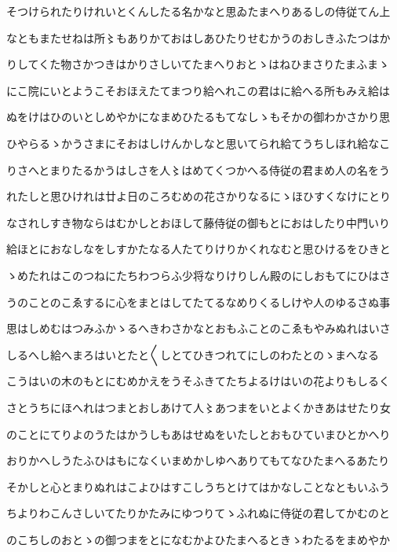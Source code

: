 \documentclass[a4paper,11pt,landscape]{ltjtarticle}
\begin{document}
そつけられたりけれいとくんしたる名かなと思ゐたまへりあるしの侍従てん上
\par\medskip
なともまたせねは所〻もありかておはしあひたりせむかうのおしきふたつはか
\par\medskip
りしてくた物さかつきはかりさしいてたまへりおとゝはねひまさりたまふまゝ
\par\medskip
にこ院にいとようこそおほえたてまつり給へれこの君はに給へる所もみえ給は
\par\medskip
ぬをけはひのいとしめやかになまめひたるもてなしゝもそかの御わかさかり思
\par\medskip
ひやらるゝかうさまにそおはしけんかしなと思いてられ給てうちしほれ給なこ
\par\medskip
りさへとまりたるかうはしさを人〻はめてくつかへる侍従の君まめ人の名をう
\par\medskip
れたしと思ひけれは廿よ日のころむめの花さかりなるにゝほひすくなけにとり
\par\medskip
なされしすき物ならはむかしとおほして藤侍従の御もとにおはしたり中門いり
\par\medskip
給ほとにおなしなをしすかたなる人たてりけりかくれなむと思ひけるをひきと
\par\medskip
ゝめたれはこのつねにたちわつらふ少将なりけりしん殿のにしおもてにひはさ
\par\medskip
うのことのこゑするに心をまとはしてたてるなめりくるしけや人のゆるさぬ事
\par\medskip
思はしめむはつみふかゝるへきわさかなとおもふことのこゑもやみぬれはいさ
\par\medskip
しるへし給へまろはいとたと〱しとてひきつれてにしのわたとのゝまへなる
\par\medskip
こうはいの木のもとにむめかえをうそふきてたちよるけはいの花よりもしるく
\par\medskip
さとうちにほへれはつまとおしあけて人〻あつまをいとよくかきあはせたり女
\par\medskip
のことにてりよのうたはかうしもあはせぬをいたしとおもひていまひとかへり
\par\medskip
おりかへしうたふひはもになくいまめかしゆへありてもてなひたまへるあたり
\par\medskip
そかしと心とまりぬれはこよひはすこしうちとけてはかなしことなともいふう
\par\medskip
ちよりわこんさしいてたりかたみにゆつりてゝふれぬに侍従の君してかむのと
\par\medskip
のこちしのおとゝの御つまをとになむかよひたまへるときゝわたるをまめやか
\par\medskip
\end{document}
